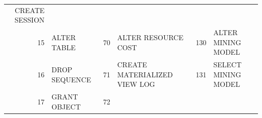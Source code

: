 \begin{appendix}
\begin{longtable}[]{@{}rl|rl|rl@{}}
\begin{minipage}[t]{0.24\columnwidth}
CREATE SESSION\strut
\end{minipage}\tabularnewline
\begin{minipage}[t]{0.06\columnwidth}\raggedright\strut
15\strut
\end{minipage} & \begin{minipage}[t]{0.19\columnwidth}\raggedright\strut
ALTER TABLE\strut
\end{minipage} & \begin{minipage}[t]{0.06\columnwidth}\raggedright\strut
70\strut
\end{minipage} & \begin{minipage}[t]{0.24\columnwidth}\raggedright\strut
ALTER RESOURCE COST\strut
\end{minipage} & \begin{minipage}[t]{0.06\columnwidth}\raggedright\strut
130\strut
\end{minipage} & \begin{minipage}[t]{0.24\columnwidth}\raggedright\strut
ALTER MINING MODEL\strut
\end{minipage}\tabularnewline
\begin{minipage}[t]{0.06\columnwidth}\raggedright\strut
16\strut
\end{minipage} & \begin{minipage}[t]{0.19\columnwidth}\raggedright\strut
DROP SEQUENCE\strut
\end{minipage} & \begin{minipage}[t]{0.06\columnwidth}\raggedright\strut
71\strut
\end{minipage} & \begin{minipage}[t]{0.24\columnwidth}\raggedright\strut
CREATE MATERIALIZED VIEW LOG\strut
\end{minipage} & \begin{minipage}[t]{0.06\columnwidth}\raggedright\strut
131\strut
\end{minipage} & \begin{minipage}[t]{0.24\columnwidth}\raggedright\strut
SELECT MINING MODEL\strut
\end{minipage}\tabularnewline
\begin{minipage}[t]{0.06\columnwidth}\raggedright\strut
17\strut
\end{minipage} & \begin{minipage}[t]{0.19\columnwidth}\raggedright\strut
GRANT OBJECT\strut
\end{minipage} & \begin{minipage}[t]{0.06\columnwidth}\raggedright\strut
72\strut
\end{minipage} & \begin{minipage}[t]{0.24\columnwidth}\raggedright\strut

\end{minipage}
\end{longtable}
\end{appendix}
